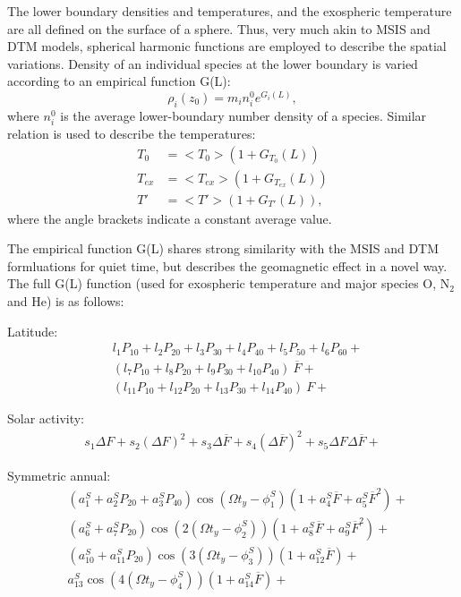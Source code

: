 \documentclass[referee,a4paper,12pt,traditabstract]{swsc}
\begin{document}
\begin{linenumbers}
The lower boundary densities and temperatures, and the exospheric temperature are all defined on the surface of a sphere. Thus, very much akin to MSIS and DTM models, spherical harmonic functions are employed to describe the spatial variations. Density of an individual species at the lower boundary is varied according to an empirical function G(L):
\begin{equation}
\rho_i(z_0) = m_in^0_i e^{G_i(L)},
\end{equation}
where $n_i^0$ is the average lower-boundary number density of a species. Similar relation is used to describe the temperatures:
\begin{align}
T_0 &= <T_0>(1+G_{T_0}(L)) \\
T_{ex} &= <T_{ex}>(1+G_{T_{ex}}(L))\\
T' &= <T'>(1+G_{T'}(L)),
\end{align}
where the angle brackets indicate a constant average value. 

The empirical function G(L) shares strong similarity with the MSIS and DTM formluations for quiet time, but describes the geomagnetic effect in a novel way. The full G(L) function (used for exospheric temperature and major species O, $\mathrm{N_{2}}$ and He) is as follows:

Latitude:
\begin{align*}
& l_1 P_{10} + l_2 P_{20} + l_3 P_{30} + l_4 P_{40} + l_5 P_{50} + l_6 P_{60} + \\
& (l_7 P_{10} + l_8 P_{20} + l_9 P_{30} + l_{10} P_{40})~\overline{F} + \\
& (l_{11} P_{10} + l_{12} P_{20} + l_{13} P_{30} + l_{14} P_{40})~F +
\end{align*}

Solar activity:
\begin{align*}
s_1 \Delta F + s_2 (\Delta F)^2 + s_3 \Delta \overline{F} + s_4 (\Delta \overline{F})^2 + s_5 \Delta F \Delta \overline{F} +
\end{align*}

Symmetric annual:
\begin{align*}
&(a^S_1 + a^S_2 P_{20} + a^S_3P_{40})\cos(\Omega t_y-\phi^S_1)(1+a^S_4\overline{F}+ a^S_5\overline{F}^2) +\\
&(a^S_6 + a^S_7 P_{20})\cos(2(\Omega t_y-\phi^S_2))(1+a^S_8\overline{F}+ a^S_9\overline{F}^2) +\\
&(a^S_{10} + a^S_{11} P_{20})\cos(3(\Omega t_y-\phi^S_3))(1+a^S_{12}\overline{F})+\\
&a^S_{13}\cos(4(\Omega t_y-\phi^S_4))(1+a^S_{14}\overline{F})+
\end{align*}


\end{linenumbers}
\end{document}
